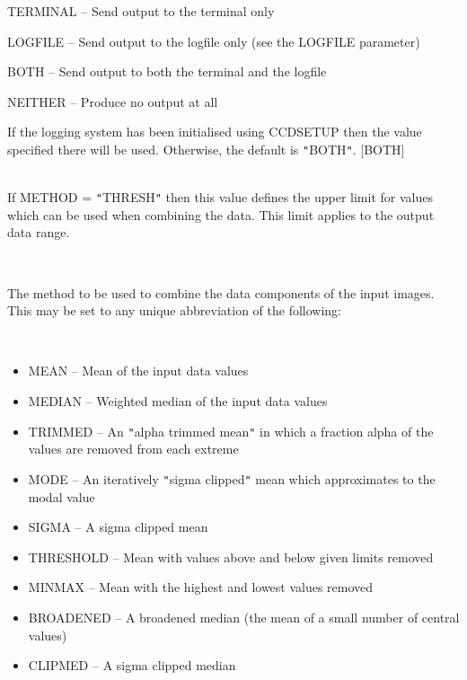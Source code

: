 \documentclass[twoside,11pt]{article}
\newcommand{\htmlref}[2]{#1}
\renewcommand{\_}{\texttt{\symbol{95}}}
\newcommand{\qt}[1]{{\tt "}#1{\tt "}}
\newcommand{\xroutine}[1]{\htmlref{{\sc #1}}{#1}}
\newcommand{\sstsubsection}[1]{ \item[{#1}] \mbox{} \\}
\newcommand{\sstitemlist}[1]{
  \mbox{} \\
  \vspace{-3.5ex}
  \begin{itemize}
     #1
  \end{itemize}
}
\newcommand{\sstitem}{\item}
\newcommand{\sstsubsection}[1]{\item[{#1}]}
\newcommand{\sstitemlist}[1]{
      \begin{itemize}
         #1
      \end{itemize}
      \\
   }
\newcommand{\sstitem}{\item}
\begin{document}
{{{{            \sstitem
               TERMINAL  -- Send output to the terminal only

            \sstitem
               LOGFILE   -- Send output to the logfile only (see the
                               LOGFILE parameter)

            \sstitem
               BOTH      -- Send output to both the terminal and the
                               logfile

            \sstitem
               NEITHER   -- Produce no output at all

         }
         If the logging system has been initialised using \xroutine{CCDSETUP}
         then the value specified there will be used. Otherwise, the
         default is \qt{BOTH}.
         [BOTH]
      }
      \sstsubsection{
         MAX = \_REAL (Read)
      } {
         If METHOD = \qt{THRESH} then this value defines the upper limit
         for values which can be used when combining the data. This
         limit applies to the output data range.
      }
      \sstsubsection{
         METHOD = LITERAL (Read)
      } {
         The method to be used to combine the data components of
         the input images. This may be set to any unique abbreviation of
         the following:
         \sstitemlist{

            \sstitem
               MEAN      -- Mean of the input data values

            \sstitem
               MEDIAN    -- Weighted median of the input data values

            \sstitem
               TRIMMED   -- An \qt{alpha trimmed mean} in which a fraction
                               alpha of the values are removed from
                               each extreme

            \sstitem
               MODE      -- An iteratively \qt{sigma clipped} mean which
                               approximates to the modal value

            \sstitem
               SIGMA     -- A sigma clipped mean

            \sstitem
               THRESHOLD -- Mean with values above and below given
                               limits removed

            \sstitem
               MINMAX    -- Mean with the highest and lowest values
                               removed

            \sstitem
               BROADENED -- A broadened median (the mean of a small
                               number of central values)
            \sstitem
               CLIPMED   -- A sigma clipped median

}}}}
\end{document}
